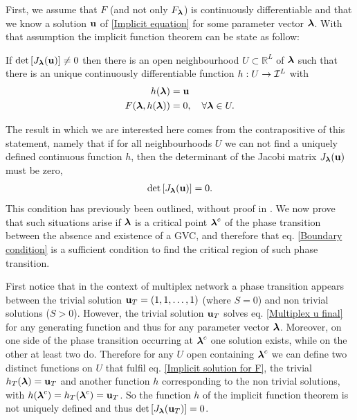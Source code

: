 \documentclass[
11pt, %
english, %
singlespacing, %
nolistspacing, %
liststotoc, %
headsepline, %
]{MastersDoctoralThesis} %
\begin{document}
First, we assume that $F$ (and not only $F_{\boldsymbol{\mathrm{\lambda}}}$) is continuously differentiable and that we know a solution $\boldsymbol{\mathrm{u}}$ of \eqref{Implicit equation} for some parameter vector $\boldsymbol{\mathrm{\lambda}}$. With that assumption the implicit function theorem can be state as follow:

If $\det\left[ J_{\boldsymbol{\mathrm{\lambda}}}(\boldsymbol{\mathrm{u}}) \right] \neq 0$ then there is an open neighbourhood $U \subset \mathbb{R}^L$ of $\boldsymbol{\mathrm{\lambda}}$ such that there is an unique continuously differentiable function $h : U \rightarrow \mathcal{I}^L$ with
\begin{align}
	h(\boldsymbol{\mathrm{\lambda}}) &= \boldsymbol{\mathrm{u}} \\
	F(\boldsymbol{\mathrm{\lambda}}, h(\boldsymbol{\mathrm{\lambda}})) &= 0, \quad \forall \boldsymbol{\mathrm{\lambda}} \in U. \label{Implicit solution for F}
\end{align}

The result in which we are interested here comes from the contrapositive of this statement, namely that if for all neighbourhoods $U$ we can not find a uniquely defined continuous function $h$, then the determinant of the Jacobi matrix $J_{\boldsymbol{\mathrm{\lambda}}}(\boldsymbol{\mathrm{u}})$ must be zero,
\begin{align}
	\det\left[ J_{\boldsymbol{\mathrm{\lambda}}}(\boldsymbol{\mathrm{u}}) \right] = 0 \label{Boundary condition}.
\end{align}
This condition has previously been outlined, without proof in \cite{baxter2012avalanche}. We now prove that such situations arise if $\boldsymbol{\mathrm{\lambda}}$ is a critical point $\boldsymbol{\mathrm{\lambda}}^c$ of the phase transition between the absence and existence of a GVC, and therefore that eq. \eqref{Boundary condition} is a sufficient condition to find the critical region of such phase transition.

First notice that in the context of multiplex network a phase transition appears between the trivial solution $\boldsymbol{\mathrm{u}}_T = (1, 1, \dots, 1)$ (where $S = 0$) and non trivial solutions ($S > 0$). However, the trivial solution $\boldsymbol{\mathrm{u}}_T$ solves eq. \eqref{Multiplex u final} for any generating function and thus for any parameter vector $\boldsymbol{\mathrm{\lambda}}$. Moreover, on one side of the phase transition occurring at $\boldsymbol{\mathrm{\lambda}}^c$ one solution exists, while on the other at least two do. Therefore for any $U$ open containing $\boldsymbol{\mathrm{\lambda}}^c$ we can define two distinct functions on $U$ that fulfil eq. \eqref{Implicit solution for F}, the trivial $h_T(\boldsymbol{\mathrm{\lambda}}) = \boldsymbol{\mathrm{u}}_T$ and another function $h$ corresponding to the non trivial solutions, with $h(\boldsymbol{\mathrm{\lambda}}^c) = h_T(\boldsymbol{\mathrm{\lambda}}^c) = \boldsymbol{\mathrm{u}}_T$. So the function $h$ of the implicit function theorem is not uniquely defined and thus $\det\left[ J_{\boldsymbol{\mathrm{\lambda}}}(\boldsymbol{\mathrm{u}}_T) \right] = 0$.
\end{document}

